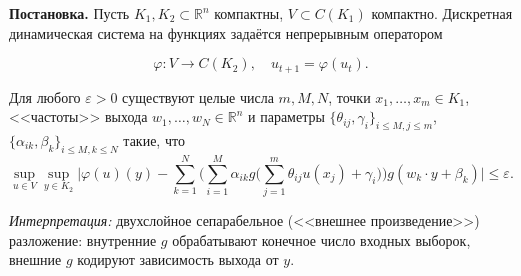 \documentclass[../NDCNNAI_main.tex]{subfiles}
\begin{document}
\textbf{Постановка.} Пусть \( K_1, K_2 \subset \mathbb{R}^n \) компактны, \( V \subset C(K_1) \) компактно. Дискретная динамическая система на функциях задаётся непрерывным оператором

\[
\varphi \colon V \to C(K_2), \quad u_{t+1} = \varphi(u_t).
\]

\begin{theorem}
Для любого \( \varepsilon > 0 \) существуют целые числа \( m, M, N \), точки \( x_1, \ldots, x_m \in K_1 \), <<частоты>> выхода \( w_1, \ldots, w_N \in \mathbb{R}^n \) и параметры \( \{\theta_{ij}, \gamma_i\}_{i \leq M, j \leq m} \), \( \{\alpha_{ik}, \beta_k\}_{i \leq M, k \leq N} \) такие, что
\[
\sup_{u \in V} \sup_{y \in K_2} \bigg| \varphi(u)(y) - \sum_{k=1}^{N} \bigg( \sum_{i=1}^{M} \alpha_{ik} g \big( \sum_{j=1}^{m} \theta_{ij} u(x_j) + \gamma_i \big) \bigg) g(w_k \cdot y + \beta_k) \bigg| \leq \varepsilon.
\]
\end{theorem}

\textit{Интерпретация:} двухслойное сепарабельное (<<внешнее произведение>>) разложение: внутренние \( g \) обрабатывают конечное число входных выборок, внешние \( g \) кодируют зависимость выхода от \( y \).
\end{document}

